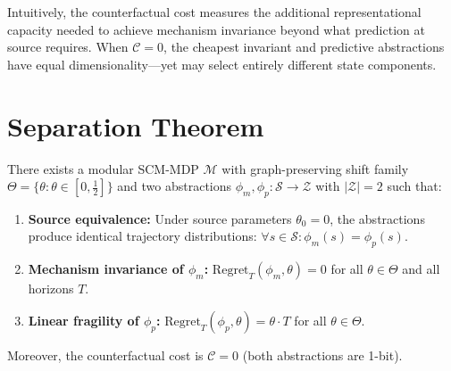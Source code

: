 \documentclass[runningheads]{llncs}
\newcommand{\phim}{\phi_m}
\newcommand{\phip}{\phi_p}
\newcommand{\Regret}{\mathrm{Regret}}
\newcommand{\Scal}{\mathcal{S}}
\newcommand{\Zcal}{\mathcal{Z}}
\newcommand{\Mcal}{\mathcal{M}}
\begin{document}
Intuitively, the counterfactual cost measures the additional representational capacity needed to achieve mechanism invariance beyond what prediction at source requires. When $\mathcal{C} = 0$, the cheapest invariant and predictive abstractions have equal dimensionality---yet may select entirely different state components.

\section{Separation Theorem}
\label{sec:theorem}

\begin{theorem}[Separation]
\label{thm:separation}
There exists a modular SCM-MDP $\Mcal$ with graph-preserving shift family $\Theta = \{\theta : \theta \in [0, \frac{1}{2}]\}$ and two abstractions $\phim, \phip: \Scal \to \Zcal$ with $|\Zcal| = 2$ such that:
\begin{enumerate}
    \item \textbf{Source equivalence:} Under source parameters $\theta_0 = 0$, the abstractions produce identical trajectory distributions: $\forall s \in \Scal: \phim(s) = \phip(s)$.
    \item \textbf{Mechanism invariance of $\phim$:} $\Regret_T(\phim, \theta) = 0$ for all $\theta \in \Theta$ and all horizons $T$.
    \item \textbf{Linear fragility of $\phip$:} $\Regret_T(\phip, \theta) = \theta \cdot T$ for all $\theta \in \Theta$.
\end{enumerate}
Moreover, the counterfactual cost is $\mathcal{C} = 0$ (both abstractions are 1-bit).
\end{theorem}
\end{document}
